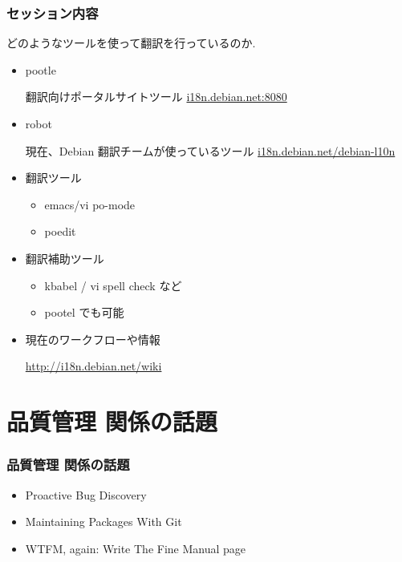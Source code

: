\documentclass[cjk,dvipdfmx,12pt]{beamer}
\begin{document}
\begin{frame}
\frametitle{セッション内容}

  どのようなツールを使って翻訳を行っているのか.
  \begin{itemize}
    \item pootle

	翻訳向けポータルサイトツール
	\url{i18n.debian.net:8080}
    \item robot

	現在、Debian 翻訳チームが使っているツール
	\url{i18n.debian.net/debian-l10n}\\
    \item 翻訳ツール
	\begin{itemize}
	  \item emacs/vi po-mode
          \item poedit
        \end{itemize}

    \item 翻訳補助ツール
	\begin{itemize}
	   \item kbabel / vi spell check など 
	   \item pootel でも可能
	\end{itemize}

    \item 現在のワークフローや情報

	\url{http://i18n.debian.net/wiki}
  \end{itemize}
\end{frame}


\section{品質管理 関係の話題}
\begin{frame} 
\frametitle{品質管理 関係の話題}

  \begin{itemize}
    \item Proactive Bug Discovery
    \item Maintaining Packages With Git
    \item WTFM, again: Write The Fine Manual page
  \end{itemize}
\end{frame}
\end{document}
